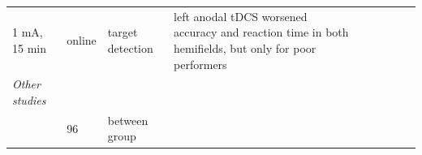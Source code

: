 \documentclass[11pt,english,]{memoir}
\begin{document}
\begin{longtable}[]{@{}lllllllll@{}}
\begin{minipage}[t]{0.05\columnwidth}
1 mA, 15
min\strut
\end{minipage} & \begin{minipage}[t]{0.05\columnwidth}\raggedright
online\strut
\end{minipage} & \begin{minipage}[t]{0.11\columnwidth}\raggedright
target detection\strut
\end{minipage} & \begin{minipage}[t]{0.24\columnwidth}\raggedright
left anodal tDCS worsened accuracy and reaction time in both
hemifields, but only for poor performers\strut
\end{minipage}\tabularnewline
\begin{minipage}[t]{0.12\columnwidth}\raggedright
\emph{Other studies}\strut
\end{minipage} & \begin{minipage}[t]{0.02\columnwidth}\raggedright
\strut
\end{minipage} & \begin{minipage}[t]{0.04\columnwidth}\raggedright
\strut
\end{minipage} & \begin{minipage}[t]{0.11\columnwidth}\raggedright
\strut
\end{minipage} & \begin{minipage}[t]{0.03\columnwidth}\raggedright
\strut
\end{minipage} & \begin{minipage}[t]{0.05\columnwidth}\raggedright
\strut
\end{minipage} & \begin{minipage}[t]{0.05\columnwidth}\raggedright
\strut
\end{minipage} & \begin{minipage}[t]{0.11\columnwidth}\raggedright
\strut
\end{minipage} & \begin{minipage}[t]{0.24\columnwidth}\raggedright
\strut
\end{minipage}\tabularnewline
\begin{minipage}[t]{0.12\columnwidth}\raggedright
\textcite{Brignani2013}\strut
\end{minipage} & \begin{minipage}[t]{0.02\columnwidth}\raggedright
96\strut
\end{minipage} & \begin{minipage}[t]{0.04\columnwidth}\raggedright
between
group\strut
\end{minipage} & \begin{minipage}[t]{0.11\columnwidth}\raggedright

\end{minipage}
\end{longtable}
\end{document}

